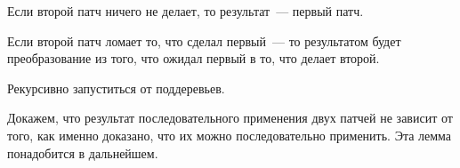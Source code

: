 Если второй патч ничего не делает, то результат~--- первый патч.

\begin{code}%
\> \AgdaSymbol{(} \AgdaSymbol{)} \AgdaSymbol{=} \<%
\end{code}

Если второй патч ломает то, что сделал первый~--- то результатом будет
преобразование из того, что ожидал первый в то, что делает второй.

\begin{code}%
\> \AgdaSymbol{(}   \AgdaSymbol{)} \AgdaSymbol{=}     \<%
\end{code}

Рекурсивно запуститься от поддеревьев.

\begin{code}%
\> \AgdaSymbol{(}  \AgdaSymbol{)} \AgdaSymbol{=}       \<%
\end{code}

Докажем, что результат последовательного применения двух патчей
не зависит от того, как именно доказано, что их можно последовательно 
применить. Эта лемма понадобится в дальнейшем.

\begin{code}%
\> \AgdaSymbol{:}  \AgdaSymbol{\{}  \AgdaSymbol{:} \AgdaSymbol{\}} \AgdaSymbol{\{} \AgdaSymbol{:}  \AgdaSymbol{\}} \AgdaSymbol{\{} \AgdaSymbol{:}  \AgdaSymbol{\}}\<%
\\
\>[0]\<[2]%
\>[2] \AgdaSymbol{(}  \AgdaSymbol{:}   \AgdaSymbol{)}      \<%
\end{code}

